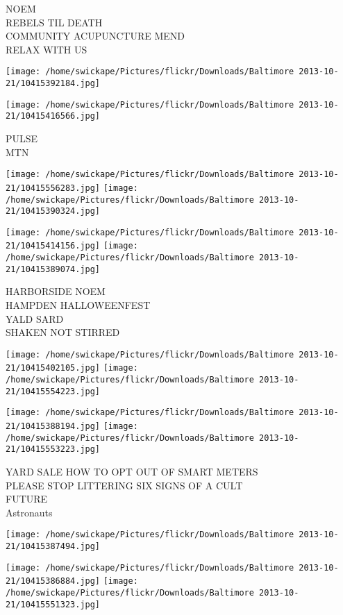 \documentclass[10pt,letterpaper]{article}
\begin{document}
NOEM\\
REBELS TIL DEATH\\
COMMUNITY ACUPUNCTURE MEND\\
RELAX WITH US
\pagebreak

\texttt{[image: /home/swickape/Pictures/flickr/Downloads/Baltimore 2013-10-21/10415392184.jpg]}

\vspace{0.25in}
\texttt{[image: /home/swickape/Pictures/flickr/Downloads/Baltimore 2013-10-21/10415416566.jpg]}

PULSE\\
MTN
\pagebreak

\texttt{[image: /home/swickape/Pictures/flickr/Downloads/Baltimore 2013-10-21/10415556283.jpg]}
\texttt{[image: /home/swickape/Pictures/flickr/Downloads/Baltimore 2013-10-21/10415390324.jpg]}

\texttt{[image: /home/swickape/Pictures/flickr/Downloads/Baltimore 2013-10-21/10415414156.jpg]}
\texttt{[image: /home/swickape/Pictures/flickr/Downloads/Baltimore 2013-10-21/10415389074.jpg]}

HARBORSIDE NOEM\\
HAMPDEN HALLOWEENFEST\\
YALD SARD\\
SHAKEN NOT STIRRED
\pagebreak

\texttt{[image: /home/swickape/Pictures/flickr/Downloads/Baltimore 2013-10-21/10415402105.jpg]}
\texttt{[image: /home/swickape/Pictures/flickr/Downloads/Baltimore 2013-10-21/10415554223.jpg]}

\texttt{[image: /home/swickape/Pictures/flickr/Downloads/Baltimore 2013-10-21/10415388194.jpg]}
\texttt{[image: /home/swickape/Pictures/flickr/Downloads/Baltimore 2013-10-21/10415553223.jpg]}

YARD SALE HOW TO OPT OUT OF SMART METERS\\
PLEASE STOP LITTERING SIX SIGNS OF A CULT\\
FUTURE\\
Astronauts
\pagebreak

\texttt{[image: /home/swickape/Pictures/flickr/Downloads/Baltimore 2013-10-21/10415387494.jpg]}

\vspace{0.25in}
\texttt{[image: /home/swickape/Pictures/flickr/Downloads/Baltimore 2013-10-21/10415386884.jpg]}
\texttt{[image: /home/swickape/Pictures/flickr/Downloads/Baltimore 2013-10-21/10415551323.jpg]}
\end{document}
